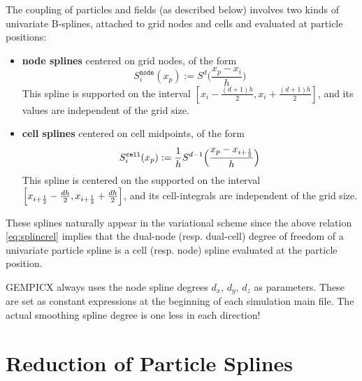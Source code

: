 \documentclass[11pt]{article}
\newcommand{\cell}{\texttt{cell}}
\newcommand{\node}{\texttt{node}}
\begin{document}
The coupling of particles and fields (as described below) involves two kinds of univariate B-splines, attached to grid nodes and cells
and evaluated at particle positions:
\begin{itemize}
    
    \item \textbf{node splines} centered on grid nodes, of the form
    $$ 
    S^\node_i(x_p) := S^d \Big(\frac{x_p-x_i}{h}\Big)
    $$
    This spline is supported on the interval $\left[x_i -\frac{(d+1)h}{2}, x_i + \frac{(d+1)h}{2} \right]$,
    and its values are independent of the grid size.

    \item \textbf{cell splines} centered on cell midpoints, of the form
    $$ 
    S^\cell_i(x_p) := \frac 1h S^{d-1}\Big(\frac{x_p - x_\iph}{h}\Big)
    $$
    This spline is centered on the supported on the interval $\left[x_{i+\frac12} -\frac{dh}{2}, x_{i+\frac12} + \frac{dh}{2} \right]$,
    and its cell-integrals are independent of the grid size.

\end{itemize}
These splines naturally appear in the variational scheme since the above relation \ref{eq:splinerel} implies that 
the dual-node (resp. dual-cell) degree of freedom of a univariate particle spline is a cell (resp. node) spline evaluated at the particle position.

\begin{note}
    GEMPICX always uses the node spline degrees $d_x$, $d_y$, $d_z$ as parameters. These are set as constant expressions at the beginning of each simulation main file. The actual smoothing spline degree is one less in each direction!
\end{note}

\section{Reduction of Particle Splines}
\label{sec:reduction_part_splines}
\end{document}

